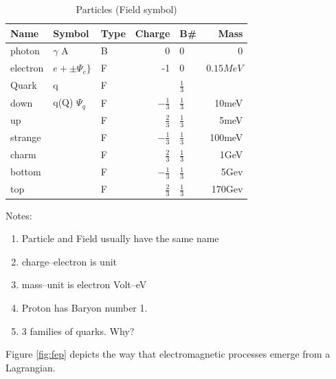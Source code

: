 \documentclass[]{article}
\begin{document}
\begin{table}[H]
	\begin{center}
		\caption{Particles (Field symbol)}
		\begin{tabular}{|l|l|l|r|l|r|}\hline
			Name&Symbol&Type&Charge&B\#&Mass\\ \hline
			photon&$\gamma$ A&B&0&0&0 \\ \hline
			electron&$e+\pm \Psi_e\}$&F&-1&0&$0.15MeV$\\ \hline
			Quark&q&F&&$\frac{1}{3}$&\\ \hline
			down&q(Q) $\Psi_q$&F&$-\frac{1}{3}$&$\frac{1}{3}$&10meV\\ \hline
			up&&F&$\frac{2}{3}$&$\frac{1}{3}$&5meV\\ \hline
			strange&&F&$-\frac{1}{3}$&$\frac{1}{3}$&100meV\\ \hline
			charm&&F&$\frac{2}{3}$&$\frac{1}{3}$&1GeV\\ \hline
			bottom&&F&$-\frac{1}{3}$&$\frac{1}{3}$&5Gev\\ \hline
			top&&F&$\frac{2}{3}$&$\frac{1}{3}$&170Gev\\ \hline
		\end{tabular}
	\end{center}
\end{table}

Notes:\begin{enumerate}
	\item Particle and Field usually have the same name
	\item charge--electron is unit
	\item mass--unit is electron Volt--eV
	\item Proton has Baryon number 1.
	\item 3 families of quarks. Why?
\end{enumerate}

Figure \ref{fig:fep} depicts the way that electromagnetic processes emerge from a Lagrangian.
\end{document}
